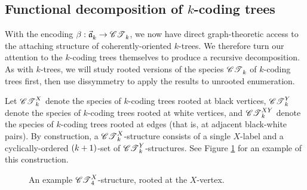 \documentclass[distribution,draft]{brandiss} %
\numberwithin{section}{chapter}
\numberwithin{figure}{chapter}
\begin{document}
\subsection{Functional decomposition of $k$-coding trees}\label{ss:codecomp}
With the encoding $\beta: \vec{\mathfrak{a}}_{k}^{} \to \mathscr{CT}_{k}^{}$, we now have direct graph-theoretic access to the attaching structure of coherently-oriented $k$-trees.
We therefore turn our attention to the $k$-coding trees themselves to produce a recursive decomposition.
As with $k$-trees, we will study rooted versions of the species $\mathscr{CT}_{k}^{}$ of $k$-coding trees first, then use dissymmetry to apply the results to unrooted enumeration.

Let $\mathscr{CT}_{k}^{X}$ denote the species of $k$-coding trees rooted at black vertices, $\mathscr{CT}_{k}^{Y}$ denote the species of $k$-coding trees rooted at white vertices, and $\mathscr{CT}_{k}^{XY}$ denote the species of $k$-coding trees rooted at edges (that is, at adjacent black-white pairs).
By construction, a $\mathscr{CT}_{k}^{X}$-structure consists of a single $X$-label and a cyclically-ordered $\left( {k+1} \right)$-set of $\mathscr{CT}_{k}^{Y}$-structures.
See Figure \ref{fig:ctxconst} for an example of this construction.

\begin{figure}[htb]
  \centering
  \def\kval{4}
  \caption[An example $X$-rooted $k$-coding tree]{An example $\ctx{\kval}$-structure, rooted at the $X$-vertex.}
  \label{fig:ctxconst}
\end{figure}
\end{document}
